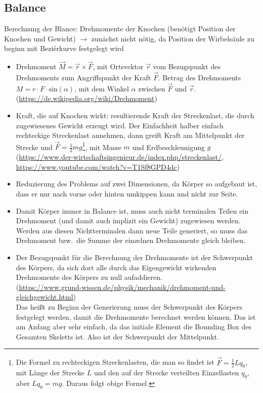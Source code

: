 \subsection{Balance} 

Berechnung der Blance: Drehmomente der Knochen (benötigt Position der Knochen und Gewicht) $\rightarrow$ zunächst nicht nötig, da Position  der Wirbelsäule zu beginn mit Beziérkurve festgelegt wird

  \begin{itemize}
   \item Drehmoment $\vec{M} = \vec{r} \times \vec{F}$, mit Ortsvektor $\vec{r}$ vom Bezugspunkt des Drehmoments zum Angriffspunkt der Kraft $\vec{F}$. Betrag des Drehmoments $M = r \cdot F \cdot \textrm{sin}(\alpha)$, mit dem Winkel $\alpha$ zwischen $\vec{F}$ und $\vec{r}$.\\
   (\url{https://de.wikipedia.org/wiki/Drehmoment})
   
   \item Kraft, die auf Knochen wirkt: resultierende Kraft der Streckenlast, die durch zugewiesenes Gewicht erzeugt wird. Der Einfachheit halber einfach rechteckige Streckenlast annehmen, dann greift Kraft am Mittelpunkt der Strecke und $\vec{F} = \frac{1}{2} m g$\footnote{Die Formel zu rechteckigen Streckenlasten, die man so findet ist $\vec{F} = \frac{1}{2} L q_0$, mit Länge der Strecke $L$ und den auf der Strecke verteilten Einzellasten $q_0$, aber $L q_0 = m g$. Daraus folgt obige Formel.}, mit Masse $m$ und Erdbeschleunigung $g$\\ (\url{https://www.der-wirtschaftsingenieur.de/index.php/streckenlast/}, \url{https://www.youtube.com/watch?v=T1Sf8GPD4dc})
   
   \item Reduzierung des Problems auf zwei Dimensionen, da Körper so aufgebaut ist, dass er nur nach vorne oder hinten umkippen kann und nicht zur Seite.
   
   \item Damit Körper immer in Balance ist, muss auch nicht terminalen Teilen ein Drehmoment (und damit auch implizit ein Gewicht) zugewiesen werden. Werden aus diesen Nichtterminalen dann neue Teile generiert, so muss das Drehmoment bzw.\ die Summe der einzelnen Drehmomente gleich bleiben.
   
   \item Der Bezugspunkt für die Berechnung der Drehmomente ist der Schwerpunkt des Körpers, da sich dort alle durch das Eigengewicht wirkenden Drehmomente des Körpers zu null aufaddieren.\\ (\url{https://www.grund-wissen.de/physik/mechanik/drehmoment-und-gleichgewicht.html})\\
   Das heißt zu Beginn der Generierung muss der Schwerpunkt des Körpers festgelegt werden, damit die Drehmomente berechnet werden können. Das ist am Anfang aber sehr einfach, da das initiale Element die Bounding Box des Gesamten Skeletts ist. Also ist der Schwerpunkt der Mittelpunkt.
   
  \end{itemize}
